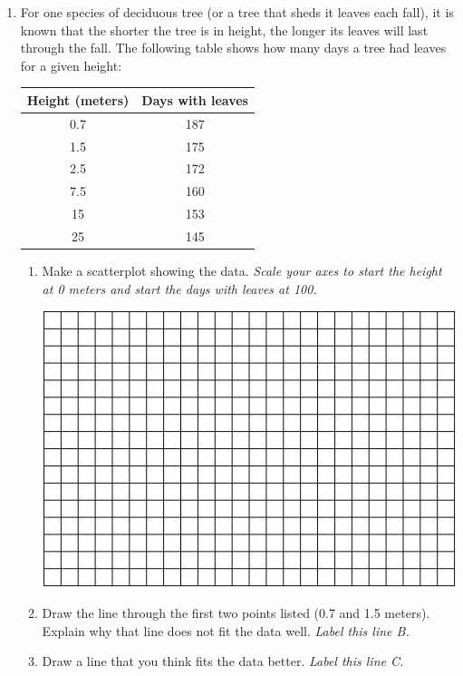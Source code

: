\documentclass[12pt]{article}
\begin{document}
\begin{enumerate}
\newpage

\item For one species of deciduous tree (or a tree that sheds it leaves each fall), it is known that the shorter the tree is in height, the longer its leaves will last through the fall.  The following table shows how many days a tree had leaves for a given height:

\begin{center}
\begin{tabular} { |  c | c |} \hline
Height (meters) & Days with leaves \\ \hline \hline
 0.7 & 187  \\ \hline
 1.5 & 175  \\ \hline
 2.5 & 172 \\ \hline
 7.5 & 160 \\  \hline
 15 & 153 \\ \hline
 25 & 145 \\ \hline
\end{tabular}
\end{center}

\begin{enumerate}
\item Make a scatterplot showing the data.  \emph{Scale your axes to start the height at 0 meters and start the days with leaves at 100.}
\vfill
\begin{center}
 {\includegraphics [width = 6in] {../GraphPaper}}
\end{center}
\vfill

\item  Draw the line through the first two points listed (0.7 and 1.5 meters).  Explain why that line does not fit the data well.  \emph{Label this line B.}
\vfill
\vfill
\vfill
\item  Draw a line that you think fits the data better.  \emph{Label this line C.}
\end{enumerate}


\end{enumerate}
\end{document}
